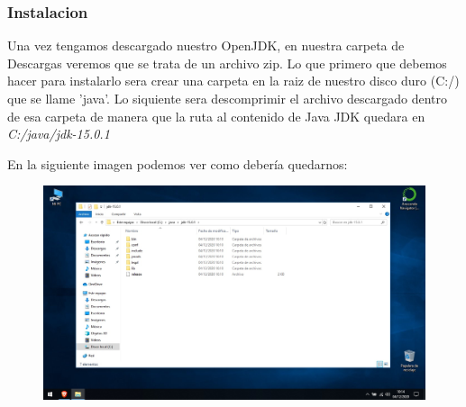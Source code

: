 \documentclass[a4paper,10pt]{article}
\begin{document}
\begin{figure}[h]
\centering
{}
\end{figure}
 
\clearpage

\subsubsection{Instalacion}

Una vez tengamos descargado nuestro OpenJDK, en nuestra carpeta de Descargas veremos que se trata de un archivo zip. Lo que primero que debemos hacer para instalarlo sera crear una carpeta en la raiz de nuestro disco duro (C:/) que se llame 'java'. Lo siquiente sera descomprimir el archivo descargado dentro de esa carpeta de manera que la ruta al contenido de Java JDK quedara en \textit{C:/java/jdk-15.0.1}

En la siguiente imagen podemos ver como debería quedarnos:

\begin{figure}[H]
\begin{center}
\includegraphics[width=450pt]{./fotos/introduccion/6 - Java.jpg}
\end{center}
\end{figure}
\end{document}
